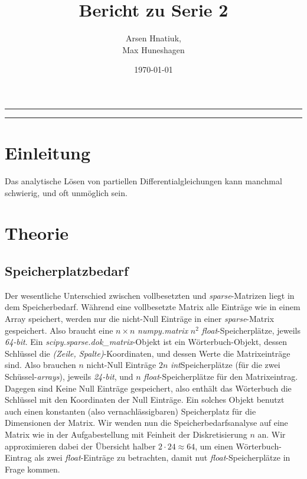\documentclass[smallheadings]{scrartcl}
\title{Bericht zu Serie 2}
\author{%
  Arsen Hnatiuk,\\%
  Max Huneshagen 
}
\date{\today}
\begin{document}
\maketitle
\tableofcontents
\bigskip

\hrule
\hrule


\section{Einleitung}

Das analytische Lösen von partiellen Differentialgleichungen kann manchmal schwierig, und oft unmöglich sein.

\section{Theorie}

\subsection{Speicherplatzbedarf}

Der wesentliche Unterschied zwischen vollbesetzten und \textit{sparse}-Matrizen  liegt in dem Speicherbedarf. Während eine vollbesetzte Matrix alle Einträge wie in einem Array speichert, werden nur die nicht-Null Einträge in einer \textit{sparse}-Matrix gespeichert. Also braucht eine $n \times n$ \textit{numpy.matrix} $n^2$ \textit{float}-Speicherplätze, jeweils \textit{64-bit}. Ein \textit{scipy.sparse.dok\_matrix}-Objekt  ist ein Wörterbuch-Objekt, dessen Schlüssel die \textit{(Zeile, Spalte)}-Koordinaten, und dessen Werte die Matrixeinträge sind. Also brauchen $n$ nicht-Null Einträge $2n$ \textit{int}Speicherplätze (für die zwei Schüssel-\textit{arrays}), jeweils \textit{24-bit}, und $n$ \textit{float}-Speicherplätze für den Matrixeintrag. Dagegen sind Keine Null Einträge gespeichert, also enthält das Wörterbuch die Schlüssel mit den Koordinaten der Null Einträge. Ein solches Objekt benutzt auch einen konstanten (also vernachlässigbaren) Speicherplatz für die Dimensionen der Matrix. Wir wenden nun die Speicherbedarfsanalyse auf eine Matrix wie in der Aufgabestellung mit Feinheit der Diskretisierung $n$ an. Wir approximieren dabei der Übersicht halber $2 \cdot 24 \approx 64$, um einen Wörterbuch-Eintrag als zwei \textit{float}-Einträge zu betrachten, damit nut \textit{float}-Speicherplätze in Frage kommen.
\end{document}
